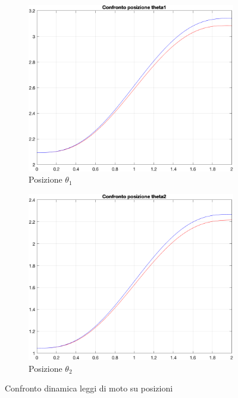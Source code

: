 \begin{figure}[!ht]
\begin{subfigure}{.5\textwidth}
  \centering
  \includegraphics[width=.8\linewidth]{Immagini/confrpost1.png}  
  \caption{Posizione $\theta_1$}
  \label{fig:sub-firsta}
\end{subfigure}
\begin{subfigure}{.5\textwidth}
  \centering
  \includegraphics[width=.8\linewidth]{Immagini/confrpost2.png}  
  \caption{Posizione $\theta_2$}
  \label{fig:sub-seconda}
\end{subfigure}
\caption{Confronto dinamica leggi di moto su posizioni}
\end{figure}
